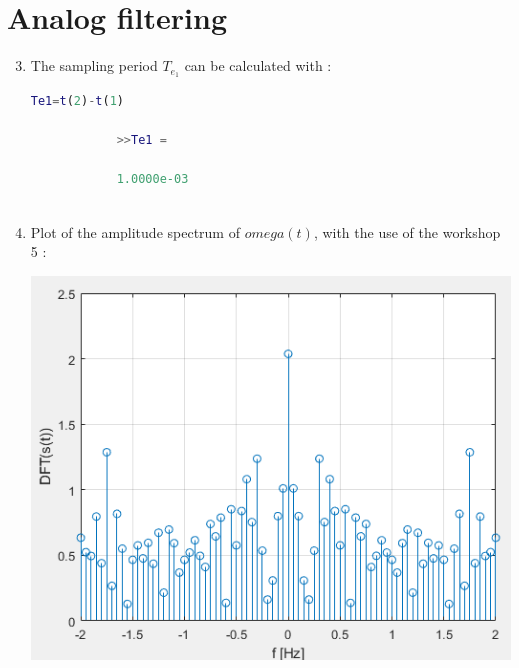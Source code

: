 \documentclass[a4paper,12pt]{article}
\begin{document}
\newpage
\section{Analog filtering}

\begin{enumerate}[label={\color{blue}\arabic*)}]
    \setcounter{enumi}{2}
    \item The sampling period \(T_{e_1}\) can be calculated with :
    
        \begin{lstlisting}[style=Matlab-editor,language=Matlab, basicstyle=\small\ttfamily]
            Te1=t(2)-t(1)
    
            >>Te1 =
    
            1.0000e-03
      
        \end{lstlisting}

    \item
    Plot of the amplitude spectrum of \(omega(t)\), with the use of the workshop 5 :

    \begin{multicols}{2}
    
        \begin{flushleft}
            \includegraphics[scale=0.35]{Images/DFT.png}
            \label{Figure2}
        \end{flushleft}
        
    \columnbreak
    

\end{multicols}
\end{enumerate}
\end{document}
